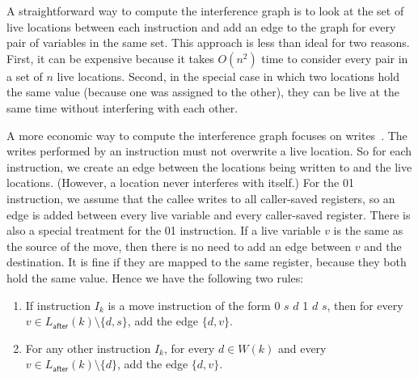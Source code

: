 \documentclass[7x10]{TimesAPriori_MIT}%
\def\xeightysixEd{0}
\def\riscvEd{1}
\def\architecture{1}
\newcommand\ifriscv[1]{\if\architecture\riscvEd{#1}\fi}
\newcommand\ifxeightsix[1]{\if\architecture\xeightysixEd{#1}\fi}
\numberwithin{theorem}{chapter}
\numberwithin{definition}{chapter}
\numberwithin{equation}{chapter}
\begin{document}
A straightforward way to compute the interference graph is to look at
the set of live locations between each instruction and add an edge to
the graph for every pair of variables in the same set.  This approach
is less than ideal for two reasons. First, it can be expensive because
it takes $O(n^2)$ time to consider every pair in a set of $n$ live
locations. Second, in the special case in which two locations hold the
same value (because one was assigned to the other), they can be live
at the same time without interfering with each other.

A more economic way to compute the interference graph focuses on
writes~\citep{Appel:2003fk}. The writes performed by an instruction
must not overwrite a live location. So for each
instruction, we create an edge between the locations being written to
and the live locations. (However, a location never interferes with
itself.) For the \ifxeightsix{}\ifriscv{}
instruction, we assume that the callee writes to all 
caller-saved registers, so an edge is added
between every live variable and every caller-saved register. There is
also a special treatment for the
\ifxeightsix{}\ifriscv{} instruction. If a live variable $v$ is the same as the source of the
move, then there is no need to add an edge between $v$ and the
destination. It is fine if they are mapped to the same register,
because they both hold the same value. 
%
Hence we have the following two rules:

\begin{enumerate}
\item If instruction $I_k$ is a move instruction of the form
  \ifxeightsix{ $s$\key{,} $d$}%
  \ifriscv{ $d$\key{,} $s$}, then for every $v \in
  L_{\mathsf{after}}(k) \setminus \{ d, s\}$, add the edge
  $\{d,v\}$.

\item For any other instruction $I_k$, for every $d \in W(k)$ and
  every $v \in L_{\mathsf{after}}(k) \setminus \{d\}$, add the edge
  $\{d,v\}$.
\end{enumerate}
\end{document}
